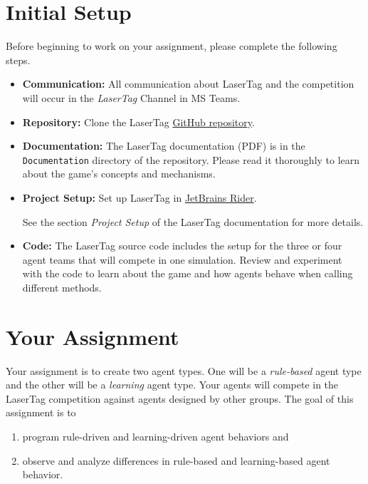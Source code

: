 \documentclass[a4paper,english,DIV=16,11pt,parskip=half,dvipsnames,listof=totoc,index=totoc,bibliography=totoc]{scrartcl}
\begin{document}
\section*{Initial Setup}

Before beginning to work on your assignment, please complete the following steps.

\begin{itemize}
  \item \textbf{Communication:} All communication about LaserTag and the competition will occur in the \emph{LaserTag} Channel in MS Teams.
  \item \textbf{Repository:} Clone the LaserTag \href{https://github.com/MARS-Group-HAW/model-mars-laser-tag-game}{GitHub repository}.
  \item \textbf{Documentation:} The LaserTag documentation (PDF) is in the \texttt{Documentation} directory of the repository. Please read it thoroughly to learn about the game's concepts and mechanisms.
  \item \textbf{Project Setup:} Set up LaserTag in \href{https://www.jetbrains.com/rider/}{JetBrains Rider}.
  
  \faLightbulbO\: See the section \emph{Project Setup} of the LaserTag documentation for more details.
  \item \textbf{Code:} The LaserTag source code includes the setup for the three or four agent teams that will compete in one simulation. Review and experiment with the code to learn about the game and how agents behave when calling different methods.
\end{itemize}


\section*{Your Assignment}
Your assignment is to create two agent types. One will be a \emph{rule-based} agent type and the other will be a \emph{learning} agent type. Your agents will compete in the LaserTag competition against agents designed by other groups. The goal of this assignment is to
\begin{enumerate}
  \item program rule-driven and learning-driven agent behaviors and
  \item observe and analyze differences in rule-based and learning-based agent behavior.
\end{enumerate}
\end{document}

